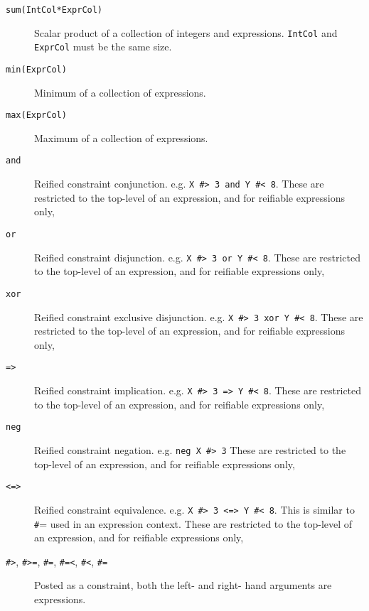 \begin{description}
\item[\texttt{sum(IntCol*ExprCol)}]
            Scalar product of a collection of integers and expressions.
            \verb'IntCol' and \verb'ExprCol' must be the same size.

\item[\texttt{min(ExprCol)}]
            Minimum of a collection of expressions.

\item[\texttt{max(ExprCol)}]
            Maximum of a collection of expressions.

\item[\texttt{and}]
            Reified constraint conjunction.  e.g. \verb'X #> 3 and Y #< 8'.
            These are restricted to the top-level of an expression,
            and for reifiable expressions only,

\item[\texttt{or}]
            Reified constraint disjunction.  e.g. \verb'X #> 3 or Y #< 8'.
            These are restricted to the top-level of an expression,
            and for reifiable expressions only,

\item[\texttt{xor}]
            Reified constraint exclusive disjunction.  e.g. \verb'X #> 3 xor Y #< 8'.
            These are restricted to the top-level of an expression,
            and for reifiable expressions only,

\item[\texttt{=>}]
            Reified constraint implication.  e.g. \verb'X #> 3 => Y #< 8'.
            These are restricted to the top-level of an expression,
            and for reifiable expressions only,

\item[\texttt{neg}]
            Reified constraint negation.  e.g. \verb'neg X #> 3'
            These are restricted to the top-level of an expression,
            and for reifiable expressions only,

\item[\texttt{<=>}]
            Reified constraint equivalence.  e.g. \verb'X #> 3 <=> Y #< 8'.
            This is similar to {\texttt \#=} used in an expression context.
            These are restricted to the top-level of an expression,
            and for reifiable expressions only,

\item[
    \texttt{\#>}, \texttt{\#>=}, \texttt{\#=}, \texttt{\#=<},
 \texttt{\#<},
    \texttt{\#\bsl=}]

    Posted as a constraint, both the left- and right- hand arguments are
    expressions.


\end{description}
